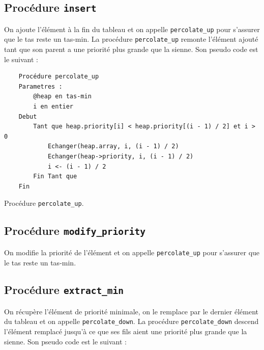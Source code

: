 \subsection{Procédure \texttt{insert}}

On ajoute l'élément à la fin du tableau et on appelle \texttt{percolate\_up} pour s'assurer que le tas reste un tas-min.
La procédure \texttt{percolate\_up} remonte l'élément ajouté tant que son parent a une priorité plus grande que la sienne.
\newline\newline
Son pseudo code est le suivant :

\begin{listing}[!htpb]
    \begin{verbatim}
    Procédure percolate_up
    Parametres :
        @heap en tas-min
        i en entier
    Debut
        Tant que heap.priority[i] < heap.priority[(i - 1) / 2] et i > 0
            Echanger(heap.array, i, (i - 1) / 2)
            Echanger(heap->priority, i, (i - 1) / 2)
            i <- (i - 1) / 2
        Fin Tant que
    Fin
    \end{verbatim}
    \caption{Procédure \texttt{percolate\_up}.}
    \label{listing:percolate_up}
\end{listing}

\subsection{Procédure \texttt{modify\_priority}}

On modifie la priorité de l'élément et on appelle \texttt{percolate\_up} pour s'assurer que le tas reste un tas-min.

\newpage

\subsection{Procédure \texttt{extract\_min}}

On récupère l'élément de priorité minimale, on le remplace par le dernier élément du tableau et on appelle \texttt{percolate\_down}.
La procédure \texttt{percolate\_down} descend l'élément remplacé jusqu'à ce que ses fils aient une priorité plus grande que la sienne.
\newline\newline
Son pseudo code est le suivant :

